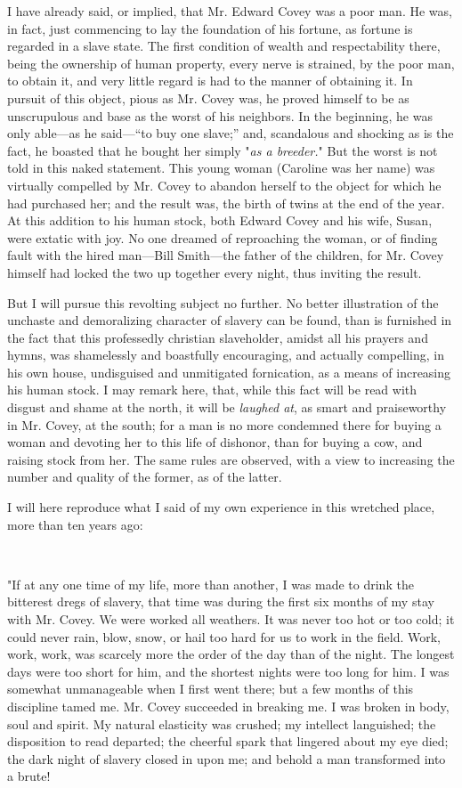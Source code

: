 I have already said, or implied, that Mr. Edward Covey was a poor man.
He was, in fact, just commencing to lay the foundation of his fortune,
as fortune is regarded in a slave state. The first condition of wealth
{\protect\hypertarget{218}{}{}}and respectability there, being the
ownership of human property, every nerve is strained, by the poor man,
to obtain it, and very little regard is had to the manner of obtaining
it. In pursuit of this object, pious as Mr. Covey was, he proved himself
to be as unscrupulous and base as the worst of his neighbors. In the
beginning, he was only able---as he said---``to buy one slave;'' and,
scandalous and shocking as is the fact, he boasted that he bought her
simply "\emph{as a breeder.}" But the worst is not told in this naked
statement. This young woman (Caroline was her name) was virtually
compelled by Mr. Covey to abandon herself to the object for which he had
purchased her; and the result was, the birth of twins at the end of the
year. At this addition to his human stock, both Edward Covey and his
wife, Susan, were extatic with joy. No one dreamed of reproaching the
woman, or of finding fault with the hired man---Bill Smith---the father
of the children, for Mr. Covey himself had locked the two up together
every night, thus inviting the result.

But I will pursue this revolting subject no further. No better
illustration of the unchaste and demoralizing character of slavery can
be found, than is furnished in the fact that this professedly christian
slaveholder, amidst all his prayers and hymns, was shamelessly and
boastfully encouraging, and actually compelling, in his own house,
undisguised and unmitigated fornication, as a means of increasing his
human stock. I may remark here, that, while this fact will be read with
disgust and shame at the north, it will be \emph{laughed at}, as smart
and praiseworthy in Mr. Covey, at the
{\protect\hypertarget{219}{}{}}south; for a man is no more condemned
there for buying a woman and devoting her to this life of dishonor, than
for buying a cow, and raising stock from her. The same rules are
observed, with a view to increasing the number and quality of the
former, as of the latter.

I will here reproduce what I said of my own experience in this wretched
place, more than ten years ago:

~

"If at any one time of my life, more than another, I was made to drink
the bitterest dregs of slavery, that time was during the first six
months of my stay with Mr. Covey. We were worked all weathers. It was
never too hot or too cold; it could never rain, blow, snow, or hail too
hard for us to work in the field. Work, work, work, was scarcely more
the order of the day than of the night. The longest days were too short
for him, and the shortest nights were too long for him. I was somewhat
unmanageable when I first went there; but a few months of this
discipline tamed me. Mr. Covey succeeded in breaking me. I was broken in
body, soul and spirit. My natural elasticity was crushed; my intellect
languished; the disposition to read departed; the cheerful spark that
lingered about my eye died; the dark night of slavery closed in upon me;
and behold a man transformed into a brute!


